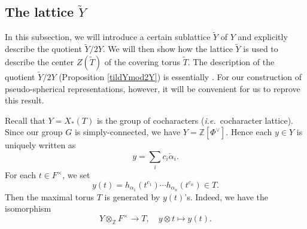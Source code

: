 \documentclass[10pt, letterpaper]{amsart}
\theoremstyle{plain}
\theoremstyle{definition}
\numberwithin{equation}{section}
\newcommand{\Z}{\mathbb{Z}}
\newcommand{\xt}{\tilde{x}}
\newcommand{\wt}{\tilde{w}}
\newcommand{\htt}{\tilde{h}}
\newcommand{\alphac}{{\check{\alpha}}}
\newcommand{\Tt}{\widetilde{T}}
\newcommand{\Yt}{\widetilde{Y}}
\newcommand{\ie}{{\it i.e.}\ }
\begin{document}

\subsection{The lattice $\Yt$}


In this subsection, we will introduce a certain sublattice $\Yt$ of $Y$ and explicitly describe the quotient $\Yt\slash 2Y$. We will then show how the lattice $\Yt$ is used to describe the center $Z(\Tt)$ of the covering torus $\Tt$. The description of the quotient $\Yt\slash 2Y$ (Proposition \ref{tildYmod2Y}) is essentially \cite[Proposition 4.2]{S04}. For our construction of pseudo-spherical representations, however, it will be convenient for us to reprove this result.

Recall that $Y=X_*(T)$ is the group of cocharacters (\ie cocharacter lattice). Since our group $G$ is simply-connected, we have $Y=\Z[\Phi^\vee]$. Hence each $y\in Y$ is uniquely written as 
\[
y=\sum_{i}c_i\alphac_i.
\] 
For each $t\in F^\times$, we set
\[
y(t)=h_{\alpha_1}(t^{c_1})\cdots h_{\alpha_n}(t^{c_n})\in T.
\]
Then the maximal torus $T$ is generated by $y(t)$'s. Indeed, we have the isomorphism
\[
Y\otimes_{\Z} F^\times\longrightarrow T,\quad y\otimes t\mapsto y(t).
\]
\end{document}
